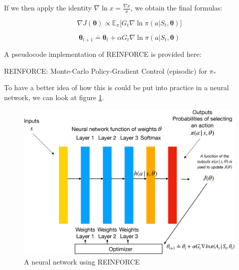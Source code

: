 If we then apply the identity $\nabla \ln{x} = \frac{\nabla x}{x}$, we obtain the final formulas:

\begin{equation}
    \nabla J(\boldsymbol{\theta}) \propto \mathbb{E}_\pi \Big[ G_t \nabla \ln{\pi (a \vert S_t, \boldsymbol{\theta})} \Big]
    \label{eq:ch8-finalreinforcepolicygradient}
\end{equation}

\begin{equation}
    \boldsymbol{\theta}_{t+1} \doteq \boldsymbol{\theta}_{t} + \alpha G_t \nabla \ln{\pi (a \vert S_t, \boldsymbol{\theta})}
    \label{eq:ch8-finalreinforceupdaterule}
\end{equation}

A pseudocode implementation of REINFORCE is provided here:

\begin{algorithm}[H]
\DontPrintSemicolon
\SetAlgoVlined
{}

\caption{REINFORCE: Monte-Carlo Policy-Gradient Control (episodic) for $\pi_*$}
\end{algorithm}

To have a better idea of how this is could be put into practice in a neural network, we can look at figure \ref{fig:ch8-reinforcepolicynetwork}.

\begin{figure}[hbp]
    \centering
    \includegraphics[scale=0.35]{Images/Chapter 8/reinforce-policy-network.png}
    \caption{A neural network using REINFORCE}
    \label{fig:ch8-reinforcepolicynetwork}
\end{figure}

